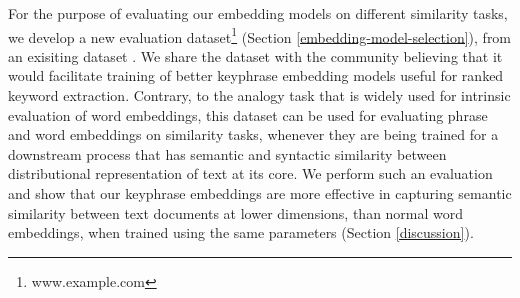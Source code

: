\documentclass[11pt,a4paper]{article}
\begin{document}
\begin{table}[htbp]
\footnotesize
\centering
\caption{\small Keywords extracted by using \textit{Key2Vec} from a sample research article abstract.}
\tabcolsep=0.10cm
\label{sample-result}
\end{table}


For the purpose of evaluating our embedding models on different similarity tasks, we develop a new evaluation dataset\footnote{www.example.com} (Section \ref{embedding-model-selection}), from an exisiting dataset \cite{dai2015document}. We share the dataset with the community believing that it would facilitate training of better keyphrase embedding models useful for ranked keyword extraction. Contrary, to the analogy task that is widely used for intrinsic evaluation of word embeddings, this dataset can be used for evaluating phrase and word embeddings on similarity tasks, whenever they are being trained for a downstream process that has semantic and syntactic similarity between distributional representation of text at its core. We perform such an evaluation and show that our keyphrase embeddings are more effective in capturing semantic similarity between text documents at lower dimensions, than normal word embeddings, when trained using the same parameters (Section \ref{discussion}).
\end{document}
